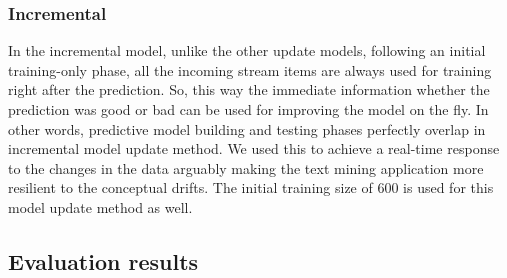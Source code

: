\documentclass{article} %
\begin{document}
\subsubsection*{Incremental}
In the incremental model, unlike the other update models, following an initial training-only phase, all the incoming stream items are always used for training right after the prediction. So, this way the immediate information whether the prediction was good or bad can be used for improving the model on the fly. In other words, predictive model building and testing phases perfectly overlap in incremental model update method. We used this to achieve a real-time response to the changes in the data arguably making the text mining application more resilient to the conceptual drifts. The initial training size of 600 is used for this model update method as well.

\subsection{Evaluation results}
\end{document}
